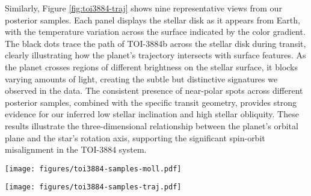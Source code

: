 \documentclass[twocolumn]{aastex631}
\begin{document}
Similarly, Figure \ref{fig:toi3884-traj} shows nine representative views from our posterior samples. Each panel displays the stellar disk as it 
appears from Earth, with the temperature variation across the surface indicated by the color gradient. The black dots trace 
the path of TOI-3884b across the stellar disk during transit, clearly illustrating how the planet's trajectory intersects 
with surface features. As the planet crosses regions of different brightness on the stellar surface, it blocks varying amounts 
of light, creating the subtle but distinctive signatures we observed in the data. The consistent presence of near-polar spots 
across different posterior samples, combined with the specific transit geometry, provides strong evidence for our inferred 
low stellar inclination and high stellar obliquity. These results illustrate the three-dimensional relationship 
between the planet's orbital plane and the star's rotation axis, supporting the significant spin-orbit misalignment in the 
TOI-3884 system.
%
\begin{figure*}[hbt!]
    \centering
    \texttt{[image: figures/toi3884-samples-moll.pdf]}
    \caption{Mollweide projections of the stellar surface of TOI-3884 showing spot distributions from nine representative 
    posterior samples. The majority of samples exhibit prominent high-latitude spot concentrations, with some variation in 
    the exact morphology and distribution. This consistent pattern of near-polar spots across different posterior samples 
    provides strong support for our inferred high-latitude magnetic activity. 
    These surface configurations produce the transit light curve modulations observed in Figure~\ref{fig:toi3884-transits}.}
    \label{fig:toi3884-moll}
\end{figure*}
%

%
\begin{figure*}[hbt!]
    \centering
    \texttt{[image: figures/toi3884-samples-traj.pdf]}
    \caption{Observer's view of TOI-3884 during transit events from nine representative posterior samples. 
    Each panel shows the stellar disk as viewed from Earth, with dark purple regions indicating cooler spots and 
    yellow-orange areas representing the warmer photosphere. Black dots trace the path of TOI-3884b across the stellar disk 
    during transit. The consistent presence of high-latitude spots intersecting or near the planet's trajectory explains the 
    asymmetries observed in the transit light curves. This visualization demonstrates how the combination of stellar inclination 
    ($i_\star = {34.8}^{+5.62}_{-6.17}$ degrees), spot distribution, and planetary orbital geometry produces the distinctive
    transit signatures in the TESS data.}
    \label{fig:toi3884-traj}
\end{figure*}
%

\end{document}
